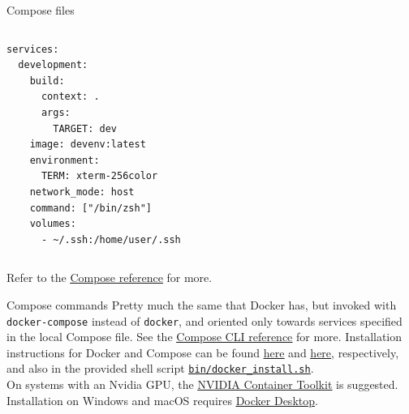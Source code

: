 \begin{frame}[fragile]{Compose files}
	\begin{columns}
		\begin{lstlisting}[language=compose, caption=Minimal example of a Compose file.]
services:
  development:
    build:
      context: .
      args:
        TARGET: dev
    image: devenv:latest
    environment:
      TERM: xterm-256color
    network_mode: host
    command: ["/bin/zsh"]
    volumes:
      - ~/.ssh:/home/user/.ssh
\end{lstlisting}
	\end{columns}
	Refer to the \href{https://docs.docker.com/compose/compose-file/}{\color{blue}\underline{Compose reference}} for more.
\end{frame}

\begin{frame}{Compose commands}
	Pretty much the same that Docker has, but invoked with
  \newline\newline
	\texttt{docker-compose}
  \newline\newline
	instead of \texttt{docker}, and oriented only towards services specified in the local Compose file.
  \newline\newline
	See the \href{https://docs.docker.com/compose/reference/}{\color{blue}\underline{Compose CLI reference}} for more.
  \newline\newline
  Installation instructions for Docker and Compose can be found \href{https://docs.docker.com/engine/install/ubuntu/}{\color{blue}\underline{here}} and \href{https://docs.docker.com/compose/install/linux/}{\color{blue}\underline{here}}, respectively, and also in the provided shell script \href{https://github.com/IntelligentSystemsLabUTV/ros2-examples/blob/humble/bin/docker_install.sh}{\color{blue}\underline{\texttt{bin/docker\_install.sh}}}.\\
  On systems with an Nvidia GPU, the \href{https://docs.nvidia.com/datacenter/cloud-native/container-toolkit/overview.html}{\color{blue}\underline{NVIDIA Container Toolkit}} is suggested.\\
  Installation on Windows and macOS requires \href{https://www.docker.com/products/docker-desktop/}{\color{blue}\underline{Docker Desktop}}.
\end{frame}
